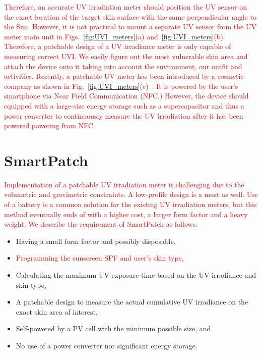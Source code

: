 \documentclass[journal]{IEEEtran}
\begin{document}
\textcolor{red}{Therefore, an accurate UV irradiation meter should position the UV sensor on the exact location of the target skin surface with the same perpendicular angle to the Sun. However, it is not practical to mount a separate UV sensor from the \textcolor{red}{UV meter main unit in Figs.~\ref{fig:UVI_meters}(a) and~\ref{fig:UVI_meters}(b)}. Therefore, a patchable design of a UV irradiance meter is only capable of measuring correct UVI. We easily figure out the most vulnerable skin area and attach the device onto it taking into account the environment, our outfit and activities. Recently, a patchable UV meter has been introduced by a cosmetic company as shown in Fig.~\ref{fig:UVI_meters}(c)~\cite{LOreal}. It is powered by the user's smartphone via Near Field Communication (NFC.) However, the device should equipped with a large-size energy storage such as a supercapacitor and thus a power converter to continuously measure the UV irradiation after it has been powered powering from NFC.}

\section{SmartPatch}

\textcolor{red}{Implementation of a patchable UV irradiation meter is challenging due to the volumetric and gravimetric constraints. A low-profile design is a must as well. Use of a battery is a common solution for the existing UV irradiation meters, but this method eventually ends of with a higher cost, a larger form factor and a heavy weight. We describe the requirement of SmartPatch as follows:}

\begin{itemize}
\item Having a small form factor and possibly disposable,
\item \textcolor{red}{Programming the sunscreen SPF and user's skin type,}
\item Calculating the maximum UV exposure time based on the UV irradiance and skin type,
\item A patchable design to measure the actual cumulative UV irradiance on the exact skin area of interest,
\item Self-powered by a PV cell with the minimum possible size, and
\item No use of a power converter nor significant energy storage.
\end{itemize}
\end{document}
